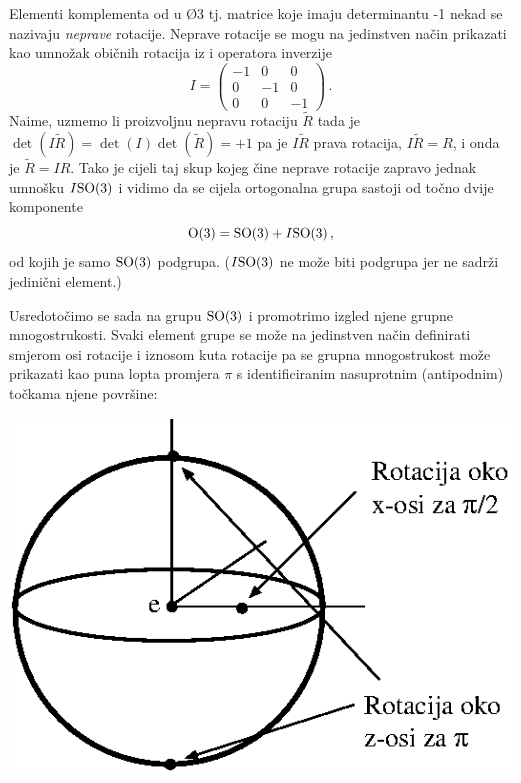 Elementi komplementa od  u \O{3} tj. matrice koje imaju determinantu -1 nekad se 
nazivaju \emph{neprave} rotacije.
Neprave rotacije se mogu na jedinstven
način prikazati kao umnožak običnih rotacija iz  i operatora inverzije
\begin{equation}
I = \begin{pmatrix}
-1 & 0 & 0 \\ 
0  &-1 & 0 \\
0  & 0 & -1
\end{pmatrix} \,.
\end{equation}
Naime, uzmemo li proizvoljnu nepravu rotaciju $\tilde{R}$ tada
je $\det (I \tilde{R}) = \det(I) \det(\tilde{R}) = +1 $ pa je $I\tilde{R}$ 
prava rotacija, $I\tilde{R} = R$,
i onda je $\tilde{R} = I R$. Tako je cijeli taj skup
kojeg čine neprave rotacije zapravo jednak umnošku $I\mathrm{SO}(3)$ i vidimo da
se cijela ortogonalna grupa sastoji od točno dvije komponente
\begin{equation}
    \mathrm{O}(3) = \mathrm{SO}(3) + I\mathrm{SO}(3)\,,
\end{equation}
od kojih je samo $\mathrm{SO}(3)$ podgrupa. ($I\mathrm{SO}(3)$ ne može biti podgrupa jer ne sadrži
jedinični element.)

Usredotočimo se sada na grupu $\mathrm{SO}(3)$ i promotrimo izgled njene grupne mnogostrukosti.
Svaki element grupe  se može na jedinstven način definirati
smjerom osi rotacije i iznosom kuta rotacije pa se grupna mnogostrukost
može prikazati kao puna lopta promjera $\pi$ s identificiranim nasuprotnim
(antipodnim) točkama njene površine:

\centerline{\includegraphics[scale=0.8]{pics/so3mnogostrukost.eps}}

